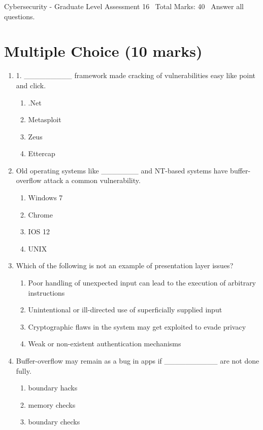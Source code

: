 \documentclass[12pt]{article}
\begin{document}
\begin{center}
Cybersecurity - Graduate Level Assessment 16 \
Total Marks: 40 \
Answer all questions.
\end{center}

\section*{Multiple Choice (10 marks)}
\begin{enumerate}[label=\arabic*.]
\item 1. \_\_\_\_\_\_\_\_\_ framework made cracking of vulnerabilities easy like point and click.
\begin{enumerate}[label=(\alph*)]
    \item .Net
    \item Metasploit
    \item Zeus
    \item Ettercap
\end{enumerate}
\item Old operating systems like \_\_\_\_\_\_\_ and NT-based systems have buffer-overflow attack a common vulnerability.
\begin{enumerate}[label=(\alph*)]
    \item Windows 7
    \item Chrome
    \item IOS 12
    \item UNIX
\end{enumerate}
\item Which of the following is not an example of presentation layer issues?
\begin{enumerate}[label=(\alph*)]
    \item Poor handling of unexpected input can lead to the execution of arbitrary instructions
    \item Unintentional or ill-directed use of superficially supplied input
    \item Cryptographic flaws in the system may get exploited to evade privacy
    \item Weak or non-existent authentication mechanisms
\end{enumerate}
\item Buffer-overflow may remain as a bug in apps if \_\_\_\_\_\_\_\_\_\_ are not done fully.
\begin{enumerate}[label=(\alph*)]
    \item boundary hacks
    \item memory checks
    \item boundary checks

\end{enumerate}
\end{enumerate}
\end{document}
